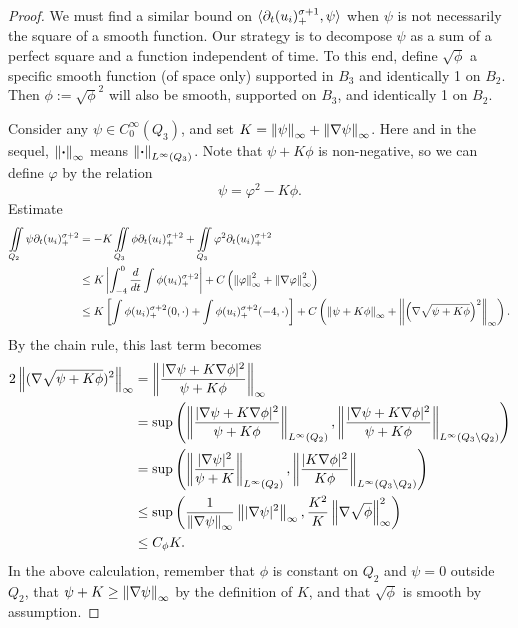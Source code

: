 \begin{proof}

We must find a similar bound on $\langle \partial_t (u_i)_+^{\sigma+1}, \psi \rangle$ when $\psi$ is not necessarily the square of a smooth function.  Our strategy is to decompose $\psi$ as a sum of a perfect square and a function independent of time.  To this end, define $\sqrt{\phi}$ a specific smooth function (of space only) supported in $B_3$ and identically 1 on $B_2$.  Then $\phi := \sqrt{\phi}^2$ will also be smooth, supported on $B_3$, and identically 1 on $B_2$.  

Consider any $\psi \in C_0^\infty(Q_3)$, and set $K = \left\lVert\psi\right\rVert_\infty + \left\lVert\nabla \psi\right\rVert_\infty$.  Here and in the sequel, $\left\lVert\boldsymbol{\cdot}\right\rVert_\infty$ means $\left\lVert\boldsymbol{\cdot}\right\rVert_{L^\infty(Q_3)}$.  Note that $\psi + K \phi$ is non-negative, so we can define $\varphi$ by the relation
\[ \psi = \varphi^2 - K \phi.\]  
Estimate
\begin{align*}
\iint\limits_{Q_2} \psi \partial_t (u_i)_+^{\sigma+2} &= -K\iint\limits_{Q_3}\phi \partial_t (u_i)_+^{\sigma+2} + \iint\limits_{Q_3} \varphi^2 \partial_t (u_i)_+^{\sigma+2}
\\ &\leq K \left\lvert \int_{-4}^0 \frac{d}{dt} \int \phi (u_i)_+^{\sigma+2}  \right\rvert + C \left( \left\lVert\varphi\right\rVert_\infty^2 + \left\lVert\nabla\varphi\right\rVert_\infty^2  \right)
\\ &\leq K \left[ \int \phi (u_i)_+^{\sigma+2}(0,\cdot) + \int \phi (u_i)_+^{\sigma+2}(-4,\cdot) \right] + C \left(  \left\lVert\psi + K \phi\right\rVert_\infty + \left\lVert\left( \nabla \sqrt{\psi + K \phi}  \right)^2\right\rVert_\infty  \right).
\end{align*}
By the chain rule, this last term becomes
\begin{align*}
2 \left\lVert(\nabla \sqrt{\psi + K \phi} )^2\right\rVert_\infty &= \left\lVert\frac{|\nabla \psi + K \nabla \phi|^2}{\psi + K \phi}\right\rVert_\infty 
\\ &= \sup\left(  \left\lVert\frac{|\nabla \psi + K \nabla \phi|^2}{\psi + K \phi}\right\rVert_{L^\infty(Q_2)} , \left\lVert\frac{|\nabla \psi + K \nabla \phi|^2}{\psi + K \phi}\right\rVert_{L^\infty(Q_3 \setminus Q_2)}  \right)
\\ &= \sup\left(  \left\lVert\frac{|\nabla \psi|^2}{\psi + K}\right\rVert_{L^\infty(Q_2)} , \left\lVert\frac{|K \nabla \phi|^2}{K \phi}\right\rVert_{L^\infty(Q_3 \setminus Q_2)}  \right)
\\ &\leq \sup\left(  \frac{1}{\left\lVert\nabla \psi\right\rVert_\infty}\left\lVert|\nabla \psi|^2\right\rVert_{\infty}, \frac{K^2}{K} \left\lVert \nabla \sqrt{\phi} \right\rVert_\infty^2  \right)
\\ &\leq C_\phi K.
\end{align*}
In the above calculation, remember that $\phi$ is constant on $Q_2$ and $\psi = 0$ outside $Q_2$, that $\psi + K \geq \left\lVert\nabla \psi\right\rVert_\infty$ by the definition of $K$, and that $\sqrt{\phi}$ is smooth by assumption.  


\end{proof}
